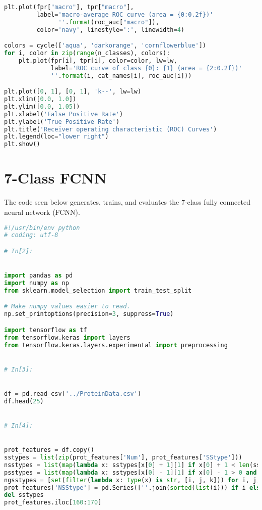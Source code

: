 \documentclass[12pt,letterpaper,oneside,reqno]{book}
\theoremstyle{plain}
\theoremstyle{definition}
\theoremstyle{plain}
\theoremstyle{remark}
\theoremstyle{plain}
\theoremstyle{definition}
\theoremstyle{plain}
\begin{document}
\begin{appendices}
\begin{lstlisting}[language=Python, label=lst:3classfcnnfull, frame=single]
plt.plot(fpr["macro"], tpr["macro"],
         label='macro-average ROC curve (area = {0:0.2f})'
               ''.format(roc_auc["macro"]),
         color='navy', linestyle=':', linewidth=4)

colors = cycle(['aqua', 'darkorange', 'cornflowerblue'])
for i, color in zip(range(n_classes), colors):
    plt.plot(fpr[i], tpr[i], color=color, lw=lw,
             label='ROC curve of class {0}: {1} (area = {2:0.2f})'
             ''.format(i, cat_names[i], roc_auc[i]))

plt.plot([0, 1], [0, 1], 'k--', lw=lw)
plt.xlim([0.0, 1.0])
plt.ylim([0.0, 1.05])
plt.xlabel('False Positive Rate')
plt.ylabel('True Positive Rate')
plt.title('Receiver operating characteristic (ROC) Curves')
plt.legend(loc="lower right")
plt.show()


\end{lstlisting}

\section{7-Class FCNN}
The code seen below generates, trains, and evaluates the 7-class fully connected neural network (FCNN).
\begin{lstlisting}[language=Python, label=lst:7classfcnnfull, frame=single]
#!/usr/bin/env python
# coding: utf-8

# In[2]:


import pandas as pd
import numpy as np
from sklearn.model_selection import train_test_split

# Make numpy values easier to read.
np.set_printoptions(precision=3, suppress=True)

import tensorflow as tf
from tensorflow.keras import layers
from tensorflow.keras.layers.experimental import preprocessing


# In[3]:


df = pd.read_csv('../ProteinData.csv')
df.head(25)


# In[4]:


prot_features = df.copy()
sstypes = list(zip(prot_features['Num'], prot_features['SStype']))
nsstypes = list(map(lambda x: sstypes[x[0] + 1][1] if x[0] + 1 < len(sstypes) and sstypes[x[0] + 1][0] == x[1][0] + 1 else np.nan, enumerate(sstypes)))
psstypes = list(map(lambda x: sstypes[x[0] - 1][1] if x[0] - 1 > 0 and sstypes[x[0] - 1][0] == x[1][0] - 1 else np.nan, enumerate(sstypes)))
ngsstypes = [set(filter(lambda x: type(x) is str, [i, j, k])) for i, j, k in zip(nsstypes, psstypes, (l for _, l in sstypes))]
prot_features['NSStype'] = pd.Series([''.join(sorted(list(i))) if i else np.nan for i in ngsstypes])
del sstypes
prot_features.iloc[160:170]



\end{lstlisting}
\end{appendices}
\end{document}
